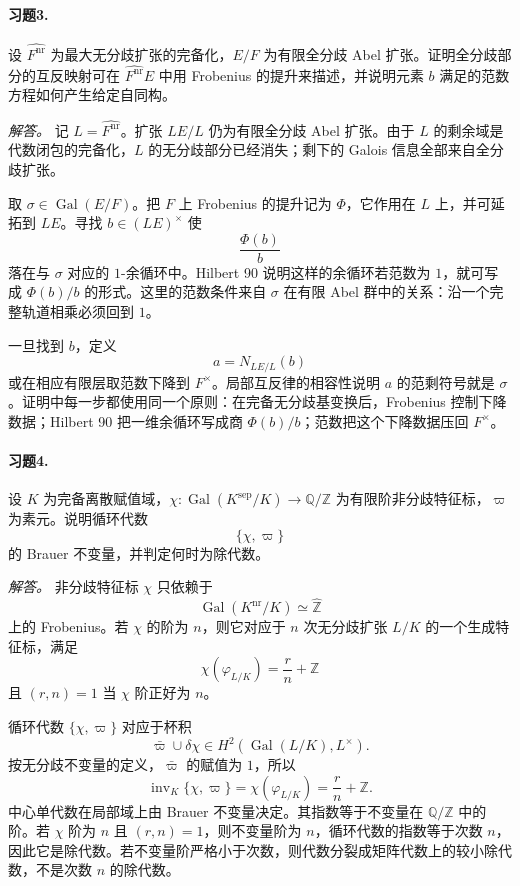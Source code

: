 \documentclass[11pt,a4paper,openany]{ctexbook}
\numberwithin{equation}{chapter}
\newcommand{\Q}{\mathbb{Q}}
\newcommand{\Z}{\mathbb{Z}}
\newcommand{\Gal}{\operatorname{Gal}}
\theoremstyle{plain}
\theoremstyle{definition}
\theoremstyle{remark}
\begin{document}
\paragraph{习题3.}
设 $\widehat{F^{\mathrm{nr}}}$ 为最大无分歧扩张的完备化，$E/F$ 为有限全分歧 Abel 扩张。证明全分歧部分的互反映射可在 $\widehat{F^{\mathrm{nr}}}E$ 中用 Frobenius 的提升来描述，并说明元素 $b$ 满足的范数方程如何产生给定自同构。

\emph{解答。}
记 $L=\widehat{F^{\mathrm{nr}}}$。扩张 $LE/L$ 仍为有限全分歧 Abel 扩张。由于 $L$ 的剩余域是代数闭包的完备化，$L$ 的无分歧部分已经消失；剩下的 Galois 信息全部来自全分歧扩张。

取 $\sigma\in\Gal(E/F)$。把 $F$ 上 Frobenius 的提升记为 $\Phi$，它作用在 $L$ 上，并可延拓到 $LE$。寻找 $b\in (LE)^\times$ 使
\[
\frac{\Phi(b)}{b}
\]
落在与 $\sigma$ 对应的 $1$-余循环中。Hilbert 90 说明这样的余循环若范数为 $1$，就可写成 $\Phi(b)/b$ 的形式。这里的范数条件来自 $\sigma$ 在有限 Abel 群中的关系：沿一个完整轨道相乘必须回到 $1$。

一旦找到 $b$，定义
\[
a=N_{LE/L}(b)
\]
或在相应有限层取范数下降到 $F^\times$。局部互反律的相容性说明 $a$ 的范剩符号就是 $\sigma$。证明中每一步都使用同一个原则：在完备无分歧基变换后，Frobenius 控制下降数据；Hilbert 90 把一维余循环写成商 $\Phi(b)/b$；范数把这个下降数据压回 $F^\times$。

\paragraph{习题4.}
设 $K$ 为完备离散赋值域，$\chi:\Gal(K^{\mathrm{sep}}/K)\to\Q/\Z$ 为有限阶非分歧特征标，$\varpi$ 为素元。说明循环代数
\[
\{\chi,\varpi\}
\]
的 Brauer 不变量，并判定何时为除代数。

\emph{解答。}
非分歧特征标 $\chi$ 只依赖于
\[
\Gal(K^{\mathrm{nr}}/K)\simeq\widehat{\Z}
\]
上的 Frobenius。若 $\chi$ 的阶为 $n$，则它对应于 $n$ 次无分歧扩张 $L/K$ 的一个生成特征标，满足
\[
\chi(\varphi_{L/K})=\frac{r}{n}+\Z
\]
且 $(r,n)=1$ 当 $\chi$ 阶正好为 $n$。

循环代数 $\{\chi,\varpi\}$ 对应于杯积
\[
\bar\varpi\cup \delta\chi\in H^2(\Gal(L/K),L^\times).
\]
按无分歧不变量的定义，$\bar\varpi$ 的赋值为 $1$，所以
\[
\operatorname{inv}_K\{\chi,\varpi\}=\chi(\varphi_{L/K})=\frac{r}{n}+\Z.
\]
中心单代数在局部域上由 Brauer 不变量决定。其指数等于不变量在 $\Q/\Z$ 中的阶。若 $\chi$ 阶为 $n$ 且 $(r,n)=1$，则不变量阶为 $n$，循环代数的指数等于次数 $n$，因此它是除代数。若不变量阶严格小于次数，则代数分裂成矩阵代数上的较小除代数，不是次数 $n$ 的除代数。
\end{document}
